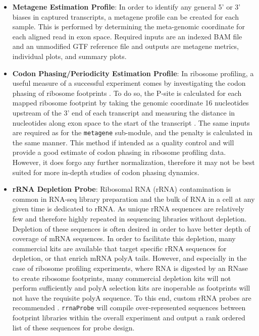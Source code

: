 \documentclass[11pt, a4paper, oneside]{article}
\begin{document}
\begin{enumerate}
\begin{itemize}
      \item \textbf{Metagene Estimation Profile}: In order to identify any general 5' or 3' biases in captured transcripts, a metagene profile can be created for each sample. This is performed by determining the meta-genomic coordinate for each aligned read in exon space. Required inputs are an indexed BAM file and an unmodified GTF reference file and outputs are metagene metrics, individual plots, and summary plots.

      \item \textbf{Codon Phasing/Periodicity Estimation Profile}: In ribosome profiling, a useful measure of a successful experiment comes by investigating the codon phasing of ribosome footprints \cite{ingolia_meth}. To do so, the P-site is calculated for each mapped ribosome footprint by taking the genomic coordinate 16 nucleotides upstream of the 3' end of each transcript and measuring the distance in nucleotides along exon space to the start of the transcript \cite{ribowaltz}. The same inputs are required as for the \texttt{metagene} sub-module, and the penalty is calculated in the same manner. This method if intended as a quality control and will provide a good estimate of codon phasing in ribosome profiling data. However, it does forgo any further normalization, therefore it may not be best suited for more in-depth studies of codon phasing dynamics.

      \item \textbf{rRNA Depletion Probe}: Ribosomal RNA (rRNA) contamination is common in RNA-seq library preparation and the bulk of RNA in a cell at any given time is dedicated to rRNA. As unique rRNA sequences are relatively few and therefore highly repeated in sequencing libraries without depletion. Depletion of these sequences is often desired in order to have better depth of coverage of mRNA sequences. In order to facilitate this depletion, many commercial kits are available that target specific rRNA sequences for depletion, or that enrich mRNA polyA tails. However, and especially in the case of ribosome profiling experiments, where RNA is digested by an RNase to create ribosome footprints, many commercial depletion kits will not perform sufficiently and polyA selection kits are inoperable as footprints will not have the requisite polyA sequence. To this end, custom rRNA probes are recommended \cite{ingolia_meth, ingolia_science}. \texttt{rrnaProbe} will compile over-represented sequences between footprint libraries within the overall experiment and output a rank ordered list of these sequences for probe design.

    \end{itemize}
\end{enumerate}
\end{document}
